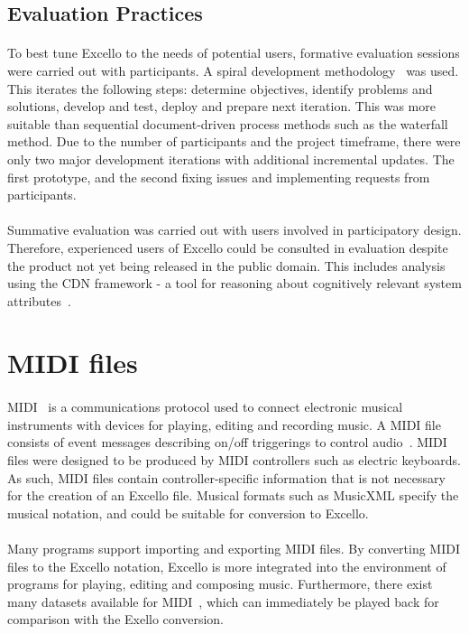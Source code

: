 \subsection{Evaluation Practices}

\paragraph{} To best tune Excello to the needs of potential users, formative evaluation sessions were carried out with participants. A spiral development methodology~\cite{boehm:spiral} was used. This iterates the following steps: determine objectives, identify problems and solutions, develop and test, deploy and prepare next iteration. This was more suitable than sequential document-driven process methods such as the waterfall method. Due to the number of participants and the project timeframe, there were only two major development iterations with additional incremental updates. The first prototype, and the second fixing issues and implementing requests from participants.

\paragraph{} Summative evaluation was carried out with users involved in participatory design. Therefore, experienced users of Excello could be consulted in evaluation despite the product not yet being released in the public domain. This includes analysis using the CDN framework - a tool for reasoning about cognitively relevant system attributes~\cite{blackwell:tutorial}.

\section{MIDI files} \label{MIDI files}

\paragraph{} MIDI~\cite{midiSpec} is a communications protocol used to connect electronic musical instruments with devices for playing, editing and recording music. A MIDI file consists of event messages describing on/off triggerings to control audio~\cite{huber:midimanual}. MIDI files were designed to be produced by MIDI controllers such as electric keyboards. As such, MIDI files contain controller-specific information that is not necessary for the creation of an Excello file. Musical formats such as MusicXML specify the musical notation, and could be suitable for conversion to Excello.

\paragraph{} Many programs support importing and exporting MIDI files. By converting MIDI files to the Excello notation, Excello is more integrated into the environment of programs for playing, editing and composing music. Furthermore, there exist many datasets available for MIDI~\cite{huang:deep}, which can immediately be played back for comparison with the Exello conversion.
